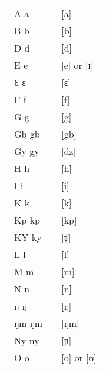 \begin{refsection}

\begin{tabular}{lcl}\\
\ A a &	\hspace{2em} &[a]\\
\ B b&	\hspace{2em} &[b]\\
\ D d&	\hspace{2em} &[d]\\
\ E e&	\hspace{2em} &[e] or [ɪ]\\
\ Ɛ ɛ&	\hspace{2em} &[ɛ]\\
\ F f&	\hspace{2em} &[f]\\
\ G g&	\hspace{2em} &[g]\\
\ Gb gb&	\hspace{2em} &[gb]\\
\ Gy gy&	\hspace{2em} &[dz]\\
\ H h&	\hspace{2em} &[h]\\
\ I i& \hspace{2em} &[i]\\
\ K k&	\hspace{2em} &[k]\\
\ Kp kp& \hspace{2em} &[kp]\\
\ KY ky&\hspace{2em} &[ʧ]\\
\ L l&	\hspace{2em} &[l]\\
\ M m&	\hspace{2em} &[m]\\
\ N n&	\hspace{2em} &[n]\\
\ ŋ ŋ&\hspace{2em} &[ŋ]\\
\ ŋm ŋm&\hspace{2em} &[ŋm]\\
\ Ny ny&\hspace{2em} &[ɲ]\\
\ O o&	\hspace{2em} &[o] or [ʊ]\\

\end{tabular}
\end{refsection}
